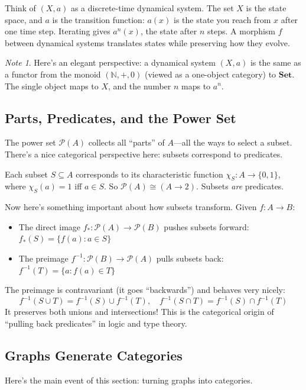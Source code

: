 \documentclass[11pt]{article}
\newcommand{\N}{\mathbb{N}}
\newcommand{\Pow}{\mathcal{P}}
\newcommand{\cat}[1]{\mathbf{#1}}
\newcommand{\Set}{\cat{Set}}
\theoremstyle{definition}
\theoremstyle{plain}
\theoremstyle{remark}
\newtheorem*{note}{Note}
\begin{document}
Think of $(X, a)$ as a discrete-time dynamical system. The set $X$ is the state space, and $a$ is the transition function: $a(x)$ is the state you reach from $x$ after one time step. Iterating gives $a^n(x)$, the state after $n$ steps. A morphism $f$ between dynamical systems translates states while preserving how they evolve.

\begin{note}
Here's an elegant perspective: a dynamical system $(X, a)$ is the same as a functor from the monoid $(\N, +, 0)$ (viewed as a one-object category) to $\Set$. The single object maps to $X$, and the number $n$ maps to $a^n$.
\end{note}

\subsection{Parts, Predicates, and the Power Set}

The power set $\Pow(A)$ collects all ``parts'' of $A$---all the ways to select a subset. There's a nice categorical perspective here: subsets correspond to predicates.

Each subset $S \subseteq A$ corresponds to its characteristic function $\chi_S: A \to \{0, 1\}$, where $\chi_S(a) = 1$ iff $a \in S$. So $\Pow(A) \cong (A \to 2)$. Subsets \emph{are} predicates.

Now here's something important about how subsets transform. Given $f: A \to B$:
\begin{itemize}
  \item The direct image $f_*: \Pow(A) \to \Pow(B)$ pushes subsets forward: $f_*(S) = \{f(a) : a \in S\}$
  \item The preimage $f^{-1}: \Pow(B) \to \Pow(A)$ pulls subsets back: $f^{-1}(T) = \{a : f(a) \in T\}$
\end{itemize}

The preimage is contravariant (it goes ``backwards'') and behaves very nicely:
\[
f^{-1}(S \cup T) = f^{-1}(S) \cup f^{-1}(T), \quad f^{-1}(S \cap T) = f^{-1}(S) \cap f^{-1}(T)
\]
It preserves both unions and intersections! This is the categorical origin of ``pulling back predicates'' in logic and type theory.

\subsection{Graphs Generate Categories}

Here's the main event of this section: turning graphs into categories.
\end{document}
